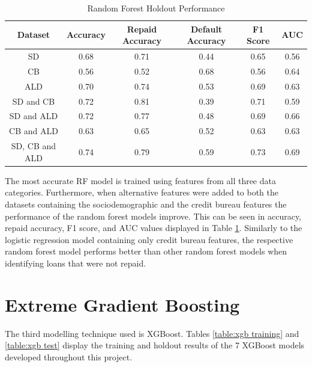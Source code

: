 \begin{table}[H]
\begin{center}
\begin{tabular}{|c|c|c|c|c|c|} 
\hline
\multicolumn{1}{|c|}{Dataset}
&\multicolumn{1}{|c|}{Accuracy}
&\multicolumn{1}{|c|}{Repaid Accuracy}
&\multicolumn{1}{|c|}{Default Accuracy}
&\multicolumn{1}{|c|}{F1 Score}
&\multicolumn{1}{|c|}{AUC}\\
\hline
SD & 0.68 & 0.71 & 0.44 & 0.65 & 0.56    \\
\hline
CB & 0.56 & 0.52 & 0.68 & 0.56 & 0.64    \\
\hline
ALD & 0.70 & 0.74 & 0.53 & 0.69 & 0.63    \\
\hline
SD and CB & 0.72 & 0.81 & 0.39 & 0.71 & 0.59    \\
\hline
SD and ALD & 0.72 & 0.77 & 0.48 & 0.69 & 0.66    \\
\hline
CB and ALD & 0.63 & 0.65 & 0.52 & 0.63 & 0.63    \\
\hline
SD, CB and ALD & 0.74 & 0.79 & 0.59 & 0.73 & 0.69    \\
\hline
\end{tabular}
\end{center}
\caption{Random Forest Holdout Performance}
\label{table:rf test}
\end{table}

\vspace{10pt}


The most accurate RF model is trained using features from all three data categories. Furthermore, when alternative features were added to both the datasets containing the sociodemographic and the credit bureau features the performance of the random forest models improve. This can be seen in accuracy, repaid accuracy, F1 score, and AUC values displayed in Table \ref{table:rf test}. Similarly to the logistic regression model containing only credit bureau features, the respective random forest model performs better than other random forest models when identifying loans that were not repaid.  




\section{Extreme Gradient Boosting}

The third modelling technique used is XGBoost. Tables \ref{table:xgb training} and \ref{table:xgb test} display the training and holdout results of the 7 XGBoost models developed throughout this project. \\

